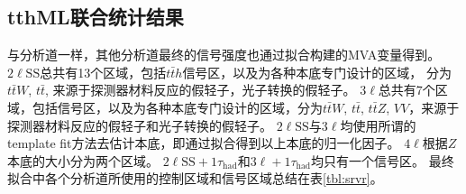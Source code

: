 \subsection{tthML联合统计结果}
与\ltwotau 分析道一样，其他分析道最终的信号强度也通过拟合构建的MVA变量得到。
$2\ell\text{SS}$总共有13个区域，包括$t\bar{t}h$信号区，以及为各种本底专门设计的区域，
分为$t\bar{t}W$, $t\bar{t}$, 来源于探测器材料反应的假轻子，光子转换的假轻子。
$3\ell$总共有7个区域，包括信号区，以及为各种本底专门设计的区域，分为$t\bar{t}W$, $t\bar{t}$, $t\bar{t}Z$, $VV$，来源于探测器材料反应的假轻子和光子转换的假轻子。
$2\ell\text{SS}$与$3\ell$均使用所谓的template fit方法去估计本底，即通过拟合得到以上本底的归一化因子。
$4\ell$根据$Z$本底的大小分为两个区域。
$2\ell\text{SS}+1\tau_{\text{had}}$和$3\ell+1\tau_{\text{had}}$均只有一个信号区。
最终拟合中各个分析道所使用的控制区域和信号区域总结在表\ref{tbl:srvr}。
